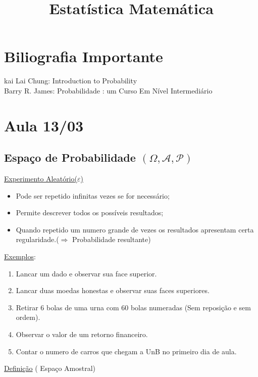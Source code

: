 \documentclass[a4paper,12pt]{article}
\author{}
\title{Estatística Matemática}
\date{}
\begin{document}
	\maketitle
	\tableofcontents	
	
	\newpage
	
	\section*{Biliografia Importante}
	
	kai Lai Chung: Introduction to Probability\\
	Barry R. James: Probabilidade : um Curso Em Nível Intermediário 
	
	\newpage
	\section{ Aula 13/03}
	\subsection{Espaço de Probabilidade $(\Omega,\mathscr{A},\mathscr{P})$ }
\underline{Experimento Aleatório($\varepsilon$) }\\
\begin{itemize}
	\item Pode ser repetido infinitas vezes se for necessário;
	\item Permite descrever todos os possíveis resultados;
	\item Quando repetido um numero grande de vezes os resultados apresentam certa regularidade.($\Rightarrow$  Probabilidade resultante)
\end{itemize}
\underline{Exemplos}:

\begin{enumerate}[label=(\arabic*)]
	\item Lancar um dado e observar sua face superior.
	\item Lancar duas moedas honestas e observar suas faces superiores.
	\item Retirar  6 bolas de uma urna com 60 bolas numeradas (Sem reposição e sem ordem).
	\item Observar o valor de um retorno financeiro.
	\item Contar o numero de carros que chegam a UnB no primeiro dia de aula.
\end{enumerate}

\underline{Definição} ( Espaço Amostral)\\
\end{document}
